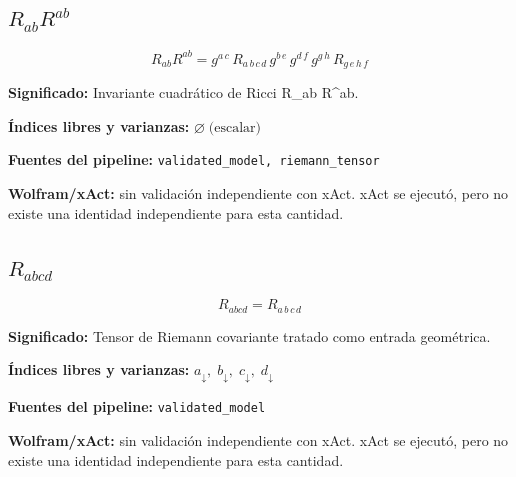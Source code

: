 \documentclass[11pt]{article}
\begin{document}
\subsection*{$ R_{ab}R^{ab} $}
\begin{dmath*}[breakdepth={5}]
R_{ab}R^{ab} = g{}^{a\,c}\,R{}_{a\,b\,c\,d}\,g{}^{b\,e}\,g{}^{d\,f}\,g{}^{g\,h}\,R{}_{g\,e\,h\,f}
\end{dmath*}
\par\vspace{1.2\baselineskip}\noindent
\begin{minipage}{\linewidth}
\textbf{Significado:} Invariante cuadrático de Ricci R\_ab R^ab.\par
\textbf{Índices libres y varianzas:} $ \varnothing\;\text{(escalar)} $\par
\textbf{Fuentes del pipeline:} \texttt{validated\_model, riemann\_tensor}\par
\textbf{Wolfram/xAct:} sin validación independiente con xAct. xAct se ejecutó, pero no existe una identidad independiente para esta cantidad.\par
\end{minipage}
\subsection*{$ R_{abcd} $}
\begin{dmath*}[breakdepth={5}]
R_{abcd} = R{}_{a\,b\,c\,d}
\end{dmath*}
\par\vspace{1.2\baselineskip}\noindent
\begin{minipage}{\linewidth}
\textbf{Significado:} Tensor de Riemann covariante tratado como entrada geométrica.\par
\textbf{Índices libres y varianzas:} $ a_{\downarrow},\;b_{\downarrow},\;c_{\downarrow},\;d_{\downarrow} $\par
\textbf{Fuentes del pipeline:} \texttt{validated\_model}\par
\textbf{Wolfram/xAct:} sin validación independiente con xAct. xAct se ejecutó, pero no existe una identidad independiente para esta cantidad.\par
\end{minipage}
\end{document}
